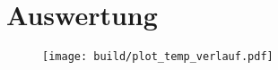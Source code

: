 \section{Auswertung}

\begin{figure}
    \texttt{[image: build/plot\_temp\_verlauf.pdf]}
\end{figure}